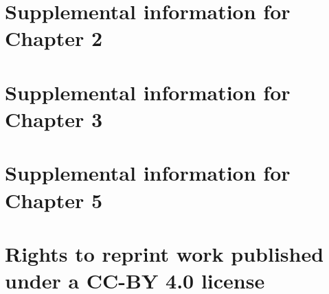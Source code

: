 \documentclass{uscthesis}
\begin{document}
%
%
%

%
\printbibliography[heading=bibintoc, title={References}] %
			       


%
%
                           
\Appendices                 %
\chapter{Supplemental information for Chapter 2}
\setcounter{page}{135}         

\chapter{Supplemental information for Chapter 3}
{}
\chapter{Supplemental information for Chapter 5}
        
\chapter{Rights to reprint work published under a CC-BY 4.0 license}

\end{document}
